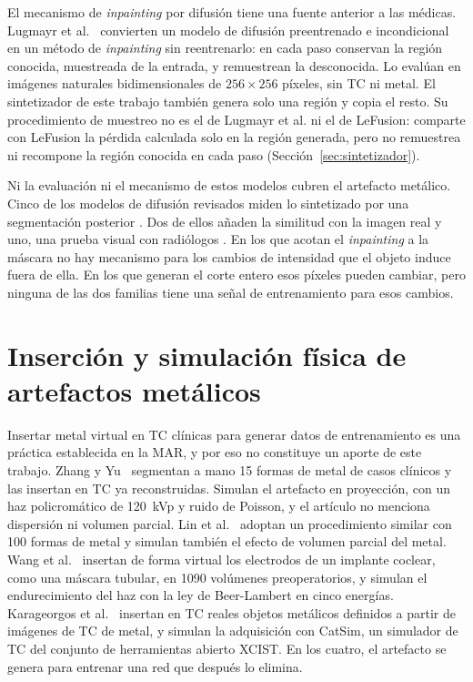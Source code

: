 El mecanismo de \emph{inpainting} por difusión tiene una fuente anterior a las médicas. Lugmayr et al.~\cite{lugmayr2022repaint} convierten un modelo de difusión preentrenado e incondicional en un método de \emph{inpainting} sin reentrenarlo: en cada paso conservan la región conocida, muestreada de la entrada, y remuestrean la desconocida. Lo evalúan en imágenes naturales bidimensionales de $256 \times 256$ píxeles, sin TC ni metal. El sintetizador de este trabajo también genera solo una región y copia el resto. Su procedimiento de muestreo no es el de Lugmayr et al. ni el de LeFusion: comparte con LeFusion la pérdida calculada solo en la región generada, pero no remuestrea ni recompone la región conocida en cada paso (Sección~\ref{sec:sintetizador}).

Ni la evaluación ni el mecanismo de estos modelos cubren el artefacto metálico. Cinco de los modelos de difusión revisados miden lo sintetizado por una segmentación posterior \cite{chen2024tumorsynthesis,ramzan2026claim,jacob2026lgesynthnet,zhang2025diffboost,zhang2025lefusion}. Dos de ellos añaden la similitud con la imagen real \cite{jacob2026lgesynthnet,zhang2025diffboost} y uno, una prueba visual con radiólogos \cite{chen2024tumorsynthesis}. En los que acotan el \emph{inpainting} a la máscara no hay mecanismo para los cambios de intensidad que el objeto induce fuera de ella. En los que generan el corte entero esos píxeles pueden cambiar, pero ninguna de las dos familias tiene una señal de entrenamiento para esos cambios.

\section{Inserción y simulación física de artefactos metálicos}\label{sec:ea-simulacion}

Insertar metal virtual en TC clínicas para generar datos de entrenamiento es una práctica establecida en la MAR, y por eso no constituye un aporte de este trabajo. Zhang y Yu~\cite{zhang2018} segmentan a mano 15 formas de metal de casos clínicos y las insertan en TC ya reconstruidas. Simulan el artefacto en proyección, con un haz policromático de 120~kVp y ruido de Poisson, y el artículo no menciona dispersión ni volumen parcial. Lin et al.~\cite{lin2019} adoptan un procedimiento similar con 100 formas de metal y simulan también el efecto de volumen parcial del metal. Wang et al.~\cite{wang2019cochlear} insertan de forma virtual los electrodos de un implante coclear, como una máscara tubular, en 1090 volúmenes preoperatorios, y simulan el endurecimiento del haz con la ley de Beer-Lambert en cinco energías. Karageorgos et al.~\cite{karageorgos2024ddpm} insertan en TC reales objetos metálicos definidos a partir de imágenes de TC de metal, y simulan la adquisición con CatSim, un simulador de TC del conjunto de herramientas abierto XCIST. En los cuatro, el artefacto se genera para entrenar una red que después lo elimina.

